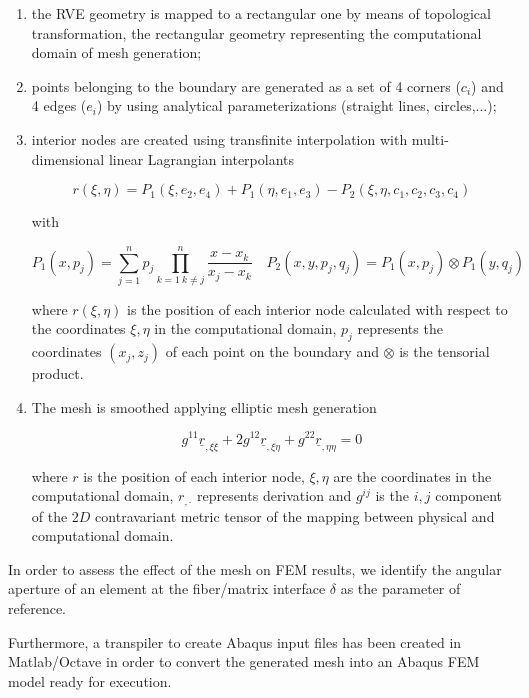 \documentclass[a4paper]{jpconf}
\begin{document}
\begin{enumerate}
\item the RVE geometry is mapped to a rectangular one by means of topological transformation, the rectangular geometry representing the computational domain of mesh generation;
\item points belonging to the boundary are generated as a set of 4 corners ($c_{i}$) and 4 edges ($e_{i}$) by using analytical parameterizations (straight lines, circles,...);
\item interior nodes are created using transfinite interpolation with multi-dimensional linear Lagrangian interpolants

\begin{equation}
r(\xi,\eta)=P_{1}(\xi,e_{2},e_{4})+P_{1}(\eta,e_{1},e_{3})- P_{2}(\xi,\eta,c_{1},c_{2},c_{3},c_{4})
\end{equation}

with

\begin{equation}
P_{1}(x,p_{j})=\sum_{j=1}^{n}p_{j}\prod_{k=1\ k\neq j}^{n}\frac{x-x_{k}}{x_{j}-x_{k}}\quad P_{2}(x,y,p_{j},q_{j})=P_{1}(x,p_{j})\otimes P_{1}(y,q_{j})
\end{equation}

where $r(\xi,\eta)$ is the position of each interior node calculated with respect to the coordinates $\xi,\eta$ in the computational domain, $p_{j}$ represents the coordinates $\left(x_{j},z_{j}\right)$ of each point on the boundary and $\otimes$ is the tensorial product.

\item The mesh is smoothed applying elliptic mesh generation

\begin{equation}
g^{11}\underline{r}_{,\xi\xi}+2g^{12}\underline{r}_{,\xi\eta}+g^{22}\underline{r}_{,\eta\eta}=0
\end{equation}

where $r$ is the position of each interior node, $\xi,\eta$ are the coordinates in the computational domain, $r_{,\cdot}$ represents derivation and $g^{ij}$ is the $i,j$ component of the $2D$ contravariant metric tensor of the mapping between physical and computational domain.
\end{enumerate}
In order to assess the effect of the mesh on FEM results, we identify the angular aperture of an element at the fiber/matrix interface $\delta$ as the parameter of reference.\par Furthermore, a transpiler to create Abaqus input files has been created in Matlab/Octave in order to convert the generated mesh into an Abaqus FEM model ready for execution.\par
\end{document}

